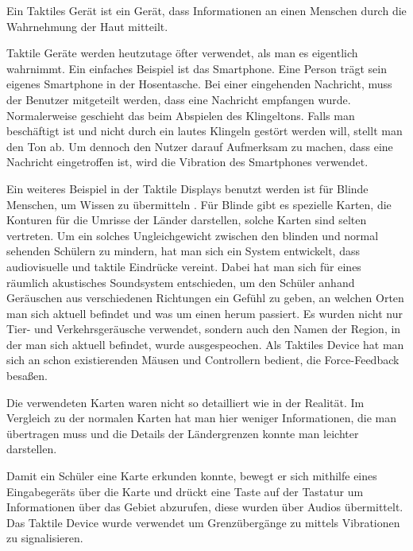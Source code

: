 
Ein Taktiles Ger{\"a}t ist ein Ger{\"a}t, dass Informationen an einen Menschen durch die Wahrnehmung der Haut mitteilt.\cite{gemperle2001design}

Taktile Ger{\"a}te werden heutzutage {\"o}fter verwendet, als man es eigentlich wahrnimmt. 
Ein einfaches Beispiel ist das Smartphone. 
Eine Person trägt sein eigenes Smartphone in der Hosentasche. 
Bei einer eingehenden Nachricht, muss der Benutzer mitgeteilt werden, dass eine Nachricht empfangen wurde.
Normalerweise geschieht das beim Abspielen des Klingeltons. Falls man besch{\"a}ftigt ist und nicht durch ein lautes Klingeln gest{\"o}rt werden will, stellt man den Ton ab. 
Um dennoch den Nutzer darauf Aufmerksam zu machen, dass eine Nachricht eingetroffen ist, wird die Vibration des Smartphones verwendet.

Ein weiteres Beispiel in der Taktile Displays benutzt werden ist f{\"u}r Blinde Menschen, um Wissen zu {\"u}bermitteln \cite{parente2003bats}. 
F{\"u}r Blinde gibt es spezielle Karten, die Konturen f{\"u}r die Umrisse der L{\"a}nder darstellen, solche Karten sind selten vertreten.
Um ein solches Ungleichgewicht zwischen den blinden und normal sehenden Sch{\"u}lern zu mindern, hat man sich ein System entwickelt, dass audiovisuelle und taktile Eindr{\"u}cke vereint. 
Dabei hat man sich f{\"u}r eines r{\"a}umlich akustisches Soundsystem entschieden, um den Sch{\"u}ler anhand Ger{\"a}uschen aus verschiedenen Richtungen ein Gef{\"u}hl zu geben, an welchen Orten man sich aktuell befindet und was um einen herum passiert. 
Es wurden nicht nur Tier- und Verkehrsger{\"a}usche verwendet, sondern auch den Namen der Region, in der man sich aktuell befindet, wurde ausgespeochen. 
Als Taktiles Device hat man sich an schon existierenden M{\"a}usen und Controllern bedient, die Force-Feedback besa{\ss}en. 

Die verwendeten Karten waren nicht so detailliert wie in der Realit{\"a}t.
Im Vergleich zu der normalen Karten hat man hier weniger Informationen, die man {\"u}bertragen muss und die Details der L{\"a}ndergrenzen konnte man leichter darstellen. 

Damit ein Sch{\"u}ler eine Karte erkunden konnte, bewegt er sich mithilfe eines Eingabeger{\"a}ts {\"u}ber die Karte und dr{\"u}ckt eine Taste auf der Tastatur um Informationen {\"u}ber das Gebiet abzurufen, diese wurden {\"u}ber Audios {\"u}bermittelt. Das Taktile Device wurde verwendet um Grenz{\"u}berg{\"a}nge zu mittels Vibrationen zu signalisieren.



